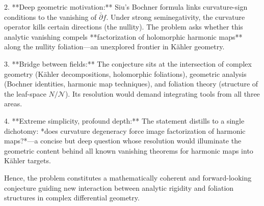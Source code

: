 2. **Deep geometric motivation:** Siu’s Bochner formula links curvature-sign conditions to the vanishing of \(\bar{\partial} f\). Under strong seminegativity, the curvature operator kills certain directions (the nullity). The problem asks whether this analytic vanishing compels **factorization of holomorphic harmonic maps** along the nullity foliation—an unexplored frontier in Kähler geometry.  

3. **Bridge between fields:** The conjecture sits at the intersection of complex geometry (Kähler decompositions, holomorphic foliations), geometric analysis (Bochner identities, harmonic map techniques), and foliation theory (structure of the leaf-space \(N/\mathcal{N}\)). Its resolution would demand integrating tools from all three areas.  

4. **Extreme simplicity, profound depth:** The statement distills to a single dichotomy: *does curvature degeneracy force image factorization of harmonic maps?*—a concise but deep question whose resolution would illuminate the geometric content behind all known vanishing theorems for harmonic maps into Kähler targets.  

Hence, the problem constitutes a mathematically coherent and forward-looking conjecture guiding new interaction between analytic rigidity and foliation structures in complex differential geometry.